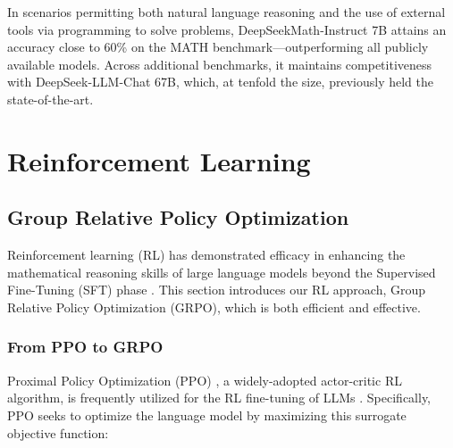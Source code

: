 In scenarios permitting both natural language reasoning and the use of external tools via programming to solve problems, DeepSeekMath-Instruct 7B attains an accuracy close to 60\% on the MATH benchmark—outperforming all publicly available models. Across additional benchmarks, it maintains competitiveness with DeepSeek-LLM-Chat 67B, which, at tenfold the size, previously held the state-of-the-art.

\section{Reinforcement Learning}

\subsection{Group Relative Policy Optimization} Reinforcement learning (RL) has demonstrated efficacy in enhancing the mathematical reasoning skills of large language models beyond the Supervised Fine-Tuning (SFT) phase \citep{wang2023math,wizardmath}. This section introduces our RL approach, Group Relative Policy Optimization (GRPO), which is both efficient and effective.

\subsubsection{From PPO to GRPO} Proximal Policy Optimization (PPO) \citep{schulman2017proximal}, a widely-adopted actor-critic RL algorithm, is frequently utilized for the RL fine-tuning of LLMs \citep{ouyang2022training}. Specifically, PPO seeks to optimize the language model by maximizing this surrogate objective function:

